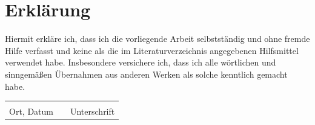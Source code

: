 \documentclass[a4paper,12pt,titlepage]{article}
\begin{document}
\section{Erklärung}
Hiermit erkläre ich, dass ich die vorliegende Arbeit selbstständig und ohne fremde Hilfe verfasst und keine als die im Literaturverzeichnis angegebenen Hilfsmittel verwendet habe. \newline
Insbesondere versichere ich, dass ich alle wörtlichen und sinngemäßen Übernahmen aus anderen Werken als solche kenntlich gemacht habe. \newline

\begin{tabular}{lp{2em}l}
 \hspace{5cm}   && \hspace{4cm} \\\cline{1-1}\cline{3-3}
 Ort, Datum     && Unterschrift
\end{tabular}
\end{document}
